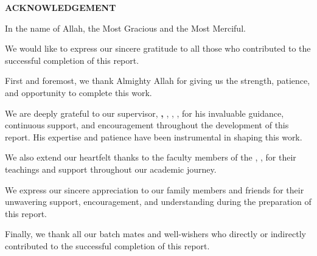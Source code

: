
\clearpage
\thispagestyle{frontmatter}
{}

\begin{center}
    {\Large\bfseries ACKNOWLEDGEMENT}
\end{center}

\vspace{0.8cm}

In the name of Allah, the Most Gracious and the Most Merciful.

We would like to express our sincere gratitude to all those who contributed to the successful completion of this report.

First and foremost, we thank Almighty Allah for giving us the strength, patience, and opportunity to complete this work.

We are deeply grateful to our supervisor, \textbf{\supervisorname, \supervisordesignation}, \departmentname, \universityname, for his invaluable guidance, continuous support, and encouragement throughout the development of this report. His expertise and patience have been instrumental in shaping this work.

We also extend our heartfelt thanks to the faculty members of the \departmentname, \universityname, for their teachings and support throughout our academic journey.

We express our sincere appreciation to our family members and friends for their unwavering support, encouragement, and understanding during the preparation of this report.

Finally, we thank all our batch mates and well-wishers who directly or indirectly contributed to the successful completion of this report.
